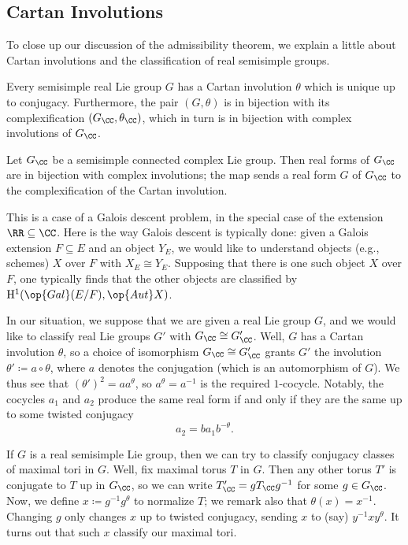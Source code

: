 \documentclass[../notes.tex]{subfiles}
\begin{document}
\subsection{Cartan Involutions}
To close up our discussion of the admissibility theorem, we explain a little about Cartan involutions and the classification of real semisimple groups.
\begin{theorem} \label{thm:cartan-exist}
	Every semisimple real Lie group $G$ has a Cartan involution $\theta$ which is unique up to conjugacy. Furthermore, the pair $(G,\theta)$ is in bijection with its complexification $(G_\CC,\theta_\CC)$, which in turn is in bijection with complex involutions of $G_\CC$.
\end{theorem}
\begin{theorem} \label{thm:classify-real-forms}
	Let $G_\CC$ be a semisimple connected complex Lie group. Then real forms of $G_\CC$ are in bijection with complex involutions; the map sends a real form $G$ of $G_\CC$ to the complexification of the Cartan involution.
\end{theorem}
This is a case of a Galois descent problem, in the special case of the extension $\RR\subseteq\CC$. Here is the way Galois descent is typically done: given a Galois extension $F\subseteq E$ and an object $Y_E$, we would like to understand objects (e.g., schemes) $X$ over $F$ with $X_E\cong Y_E$. Supposing that there is one such object $X$ over $F$, one typically finds that the other objects are classified by $\mathrm H^1(\op{Gal}(E/F),\op{Aut}X)$.
\begin{example}
	In our situation, we suppose that we are given a real Lie group $G$, and we would like to classify real Lie groups $G'$ with $G_\CC\cong G'_\CC$. Well, $G$ has a Cartan involution $\theta$, so a choice of isomorphism $G_\CC\cong G'_\CC$ grants $G'$ the involution $\theta'\coloneqq a\circ\theta$, where $a$ denotes the conjugation (which is an automorphism of $G$). We thus see that $(\theta')^2=aa^\theta$, so $a^\theta=a^{-1}$ is the required $1$-cocycle. Notably, the cocycles $a_1$ and $a_2$ produce the same real form if and only if they are the same up to some twisted conjugacy
	\[a_2=ba_1b^{-\theta}.\]
\end{example}
\begin{example}
	If $G$ is a real semisimple Lie group, then we can try to classify conjugacy classes of maximal tori in $G$. Well, fix maximal torus $T$ in $G$. Then any other torus $T'$ is conjugate to $T$ up in $G_\CC$, so we can write $T'_\CC=gT_\CC g^{-1}$ for some $g\in G_\CC$. Now, we define $x\coloneqq g^{-1}g^\theta$ to normalize $T$; we remark also that $\theta(x)=x^{-1}$. Changing $g$ only changes $x$ up to twisted conjugacy, sending $x$ to (say) $y^{-1}xy^\theta$. It turns out that such $x$ classify our maximal tori.
\end{example}
\end{document}
